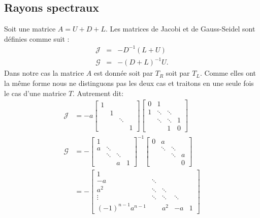\subsection{Rayons spectraux}
Soit une matrice $A=U+D+L$. Les matrices de Jacobi et de Gauss-Seidel sont définies comme suit :
\begin{eqnarray}
  \mathcal{J} &=& -D^{-1}(L+U)\\
  \mathcal{G} &=& -(D+L)^{-1}U.
\end{eqnarray}
Dans notre cas la matrice $A$ est donnée soit par $T_R$ soit par $T_L$. Comme elles ont la même forme nous ne distinguons pas les deux cas et traitons en une seule fois le cas d'une matrice $T$. Autrement dit:
\begin{align*}
  \mathcal{J} & = - a
  \begin{bmatrix}
    1 & & &\\
      & 1 & &\\
      & & \ddots & \\
      & & & 1
  \end{bmatrix}
  \begin{bmatrix}
    0 & 1& &\\
    1 & \ddots & \ddots &\\
      & \ddots & \ddots & 1 \\
      & & 1 & 0
  \end{bmatrix}\\
  \mathcal{G} & = -
  \begin{bmatrix}
    1 & & &\\
    a & \ddots &  &\\
      & \ddots & \ddots  &  \\
      & & a & 1
  \end{bmatrix} ^{-1}
  \begin{bmatrix}
    0 & a & &\\
      & \ddots &  \ddots &\\
      &  & \ddots  & a \\
      & &  & 0
  \end{bmatrix}
  \\
  & = -
  \begin{bmatrix}
    1 & & & &\\
    -a & \ddots &  & &\\
    a^2 & \ddots & \ddots  &  &\\
    \vdots & \ddots & \ddots & \ddots & \\
    (-1)^{n-1}a^{n-1} & & a^2 & -a & 1
  \end{bmatrix}

\end{align*}
